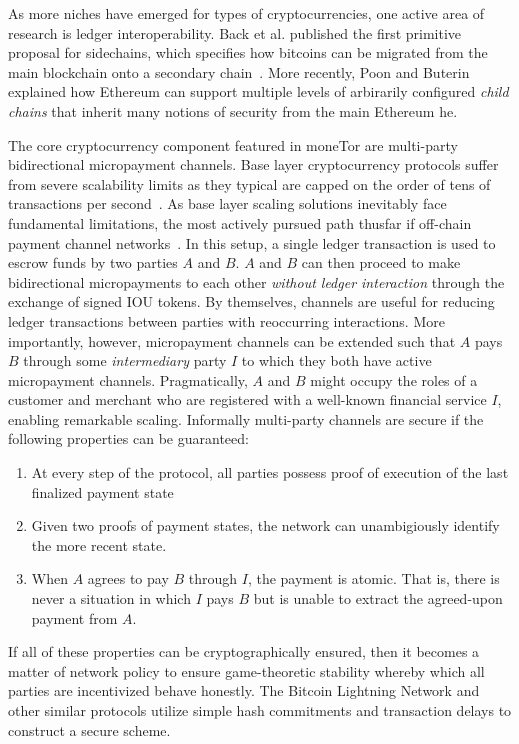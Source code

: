 As more niches have emerged for types of cryptocurrencies, one active area of
research is ledger interoperability. Back et al. published the first primitive
proposal for sidechains, which specifies how bitcoins can be migrated from the
main blockchain onto a secondary chain~\cite{back2014enabling}.  More recently,
Poon and Buterin explained how Ethereum can support multiple levels of
arbirarily configured \emph{child chains} that inherit many notions of security
from the main Ethereum he.

The core cryptocurrency component featured in moneTor are multi-party
bidirectional micropayment channels. Base layer cryptocurrency protocols suffer
from severe scalability limits as they typical are capped on the order of tens
of transactions per second~\cite{team2017blockchain}. As base layer scaling
solutions inevitably face fundamental limitations, the most actively pursued
path thusfar if off-chain payment channel networks~\cite{poon2016bitcoin}. In
this setup, a single ledger transaction is used to escrow funds by two parties
$A$ and $B$. $A$ and $B$ can then proceed to make bidirectional micropayments to
each other \emph{without ledger interaction} through the exchange of signed IOU
tokens. By themselves, channels are useful for reducing ledger transactions
between parties with reoccurring interactions. More importantly, however,
micropayment channels can be extended such that $A$ pays $B$ through some
\emph{intermediary} party $I$ to which they both have active micropayment
channels. Pragmatically, $A$ and $B$ might occupy the roles of a customer and
merchant who are registered with a well-known financial service $I$, enabling
remarkable scaling. Informally multi-party channels are secure if the following
properties can be guaranteed:

\begin{enumerate}
\item At every step of the protocol, all parties possess proof of execution of
  the last finalized payment state
\item Given two proofs of payment states, the network can unambigiously identify
  the more recent state.
\item When $A$ agrees to pay $B$ through $I$, the payment is atomic. That is,
  there is never a situation in which $I$ pays $B$ but is unable to extract the
  agreed-upon payment from $A$.
\end{enumerate}

If all of these properties can be cryptographically ensured, then it becomes a
matter of network policy to ensure game-theoretic stability whereby which all
parties are incentivized behave honestly. The Bitcoin Lightning Network and
other similar protocols utilize simple hash commitments and transaction delays
to construct a secure scheme.

